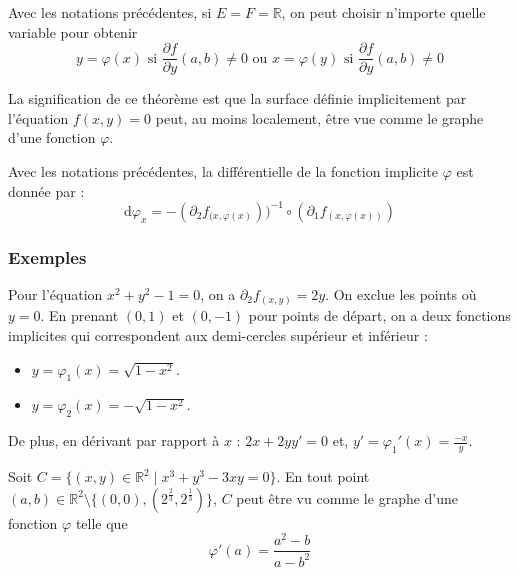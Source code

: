 
  \begin{remark}
    Avec les notations précédentes, si $E = F = \mathbb{R}$, on peut choisir n'importe quelle variable pour obtenir
    \[ y = \varphi(x) \text{ si } \frac{\partial f}{\partial y}(a,b) \neq 0 \text{ ou } x = \varphi(y) \text{ si } \frac{\partial f}{\partial y}(a,b) \neq 0 \]
  \end{remark}


  \begin{remark}
    La signification de ce théorème est que la surface définie implicitement par l'équation $f(x,y)=0$ peut, au moins localement, être vue comme le graphe d'une fonction $\varphi$.
  \end{remark}

  \begin{proposition}
    Avec les notations précédentes, la différentielle de la fonction implicite $\varphi$ est donnée par :
    \[ \mathrm{d}\varphi_x = -(\partial_2 f_{(x, \varphi(x)}))^{-1} \circ (\partial_1 f_{(x, \varphi(x))}) \]
  \end{proposition}

  \subsubsection{Exemples}

  \begin{example}
    Pour l'équation $x^2 + y^2 - 1 = 0$, on a $\partial_2 f_{(x,y)} = 2y$. On exclue les points où $y = 0$. En prenant $(0,1)$ et $(0,-1)$ pour points de départ, on a deux fonctions implicites qui correspondent aux demi-cercles supérieur et inférieur :
    \begin{itemize}
      \item $y = \varphi_1(x) = \sqrt{1-x^2}$.
      \item $y = \varphi_2(x) = -\sqrt{1-x^2}$.
    \end{itemize}
    De plus, en dérivant par rapport à $x$ : $2x + 2yy' = 0$ et, $y' = \varphi_1'(x) = \frac{-x}{y}$.
  \end{example}


  \begin{example}
    Soit $C = \{ (x,y) \in \mathbb{R}^2 \mid x^3 + y^3 - 3xy = 0 \}$. En tout point $(a,b) \in \mathbb{R}^2 \setminus \{ (0,0), (2^{\frac{2}{3}}, 2^{\frac{1}{3}}) \}$, $C$ peut être vu comme le graphe d'une fonction $\varphi$ telle que
    \[ \varphi'(a) = \frac{a^2-b}{a-b^2} \]
  \end{example}

